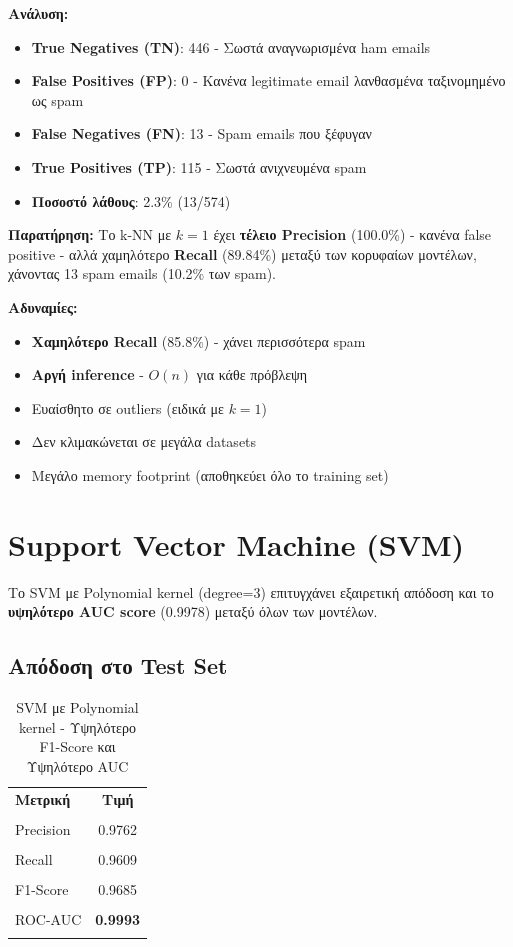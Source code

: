 \documentclass[12pt,a4paper,twoside]{book}
\begin{document}
\textbf{Ανάλυση:}
\begin{itemize}
    \item \textbf{True Negatives (TN)}: 446 - Σωστά αναγνωρισμένα ham emails
    \item \textbf{False Positives (FP)}: 0 - Κανένα legitimate email λανθασμένα ταξινομημένο ως spam
    \item \textbf{False Negatives (FN)}: 13 - Spam emails που ξέφυγαν
    \item \textbf{True Positives (TP)}: 115 - Σωστά ανιχνευμένα spam
    \item \textbf{Ποσοστό λάθους}: 2.3\% (13/574)
\end{itemize}

\textbf{Παρατήρηση:} Το k-NN με \(k=1\) έχει \textbf{τέλειο Precision} (100.0\%) - κανένα false positive - αλλά χαμηλότερο \textbf{Recall} (89.84\%) μεταξύ των κορυφαίων μοντέλων, χάνοντας 13 spam emails (10.2\% των spam).

\textbf{Αδυναμίες:}
\begin{itemize}
    \item \textbf{Χαμηλότερο Recall} (85.8\%) - χάνει περισσότερα spam
    \item \textbf{Αργή inference} - \(O(n)\) για κάθε πρόβλεψη
    \item Ευαίσθητο σε outliers (ειδικά με \(k=1\))
    \item Δεν κλιμακώνεται σε μεγάλα datasets
    \item Μεγάλο memory footprint (αποθηκεύει όλο το training set)
\end{itemize}

\section{Support Vector Machine (SVM)}

Το SVM με Polynomial kernel (degree=3) επιτυγχάνει εξαιρετική απόδοση και το \textbf{υψηλότερο AUC score} (0.9978) μεταξύ όλων των μοντέλων.

\subsection{Απόδοση στο Test Set}

\begin{table}[H]
    \centering
    \begin{tabular}{lc}
        \hline
        \textbf{Μετρική} & \textbf{Τιμή}   \\\\
        \hline
        Precision        & 0.9762          \\\\
        Recall           & 0.9609          \\\\
        F1-Score         & 0.9685          \\\\
        ROC-AUC          & \textbf{0.9993} \\\\
        \hline
    \end{tabular}
    \caption{SVM με Polynomial kernel - Υψηλότερο F1-Score και Υψηλότερο AUC}
\end{table}
\end{document}
